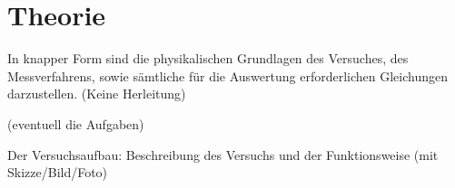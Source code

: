 \section{Theorie}
\label{sec:Theorie}

In knapper Form sind die physikalischen Grundlagen des Versuches, des Messverfahrens, sowie sämtliche für die Auswertung erforderlichen Gleichungen darzustellen. (Keine Herleitung)

(eventuell die Aufgaben)

Der Versuchsaufbau: Beschreibung des Versuchs und der Funktionsweise (mit Skizze/Bild/Foto)
